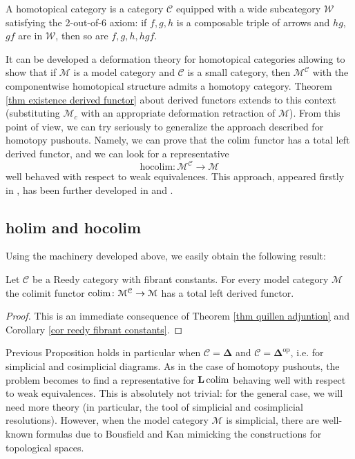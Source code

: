 \begin{refsection}
\begin{defin}
A homotopical category is a category $\mathcal C$ equipped with a wide subcategory $\mathcal W$ satisfying the 2-out-of-6 axiom: if $f,g,h$ is a composable triple of arrows and $hg$, $gf$ are in $\mathcal W$, then so are $f,g,h,hgf$.
\end{defin}

It can be developed a deformation theory for homotopical categories allowing to show that if $\mathcal M$ is a model category and $\mathcal C$ is a small category, then $\mathcal M^{\mathcal C}$ with the componentwise homotopical structure admits a homotopy category. Theorem \ref{thm existence derived functor} about derived functors extends to this context (substituting $\mathcal M_c$ with an appropriate deformation retraction of $\mathcal M$). From this point of view, we can try seriously to generalize the approach described for homotopy pushouts. Namely, we can prove that the $\operatorname*{colim}$ functor has a total left derived functor, and we can look for a representative
\[
\mathrm{hocolim} \colon \mathcal M^{\mathcal C} \to \mathcal M
\]
well behaved with respect to weak equivalences. This approach, appeared firstly in \cite{dhk}, has been further developed in \cite{shulman} and \cite{riehl}.


\subsection{holim and hocolim}

Using the machinery developed above, we easily obtain the following result:

\begin{prop}
Let $\mathcal C$ be a Reedy category with fibrant constants. For every model category $\mathcal M$ the colimit functor $\operatorname*{colim} \colon \mathcal M^{\mathcal C} \to \mathcal M$ has a total left derived functor.
\end{prop}

\begin{proof}
This is an immediate consequence of Theorem \ref{thm quillen adjuntion} and Corollary \ref{cor reedy fibrant constants}.
\end{proof}

Previous Proposition holds in particular when $\mathcal C = \boldsymbol\Delta$ and $\mathcal C = \boldsymbol\Delta^{\mathrm{op}}$, i.e. for simplicial and cosimplicial diagrams. As in the case of homotopy pushouts, the problem becomes to find a representative for $\mathbf L \operatorname*{colim}$ behaving well with respect to weak equivalences. This is absolutely not trivial: for the general case, we will need more theory (in particular, the tool of simplicial and cosimplicial resolutions). However, when the model category $\mathcal M$ is simplicial, there are well-known formulas due to Bousfield and Kan mimicking the constructions for topological spaces.


\end{refsection}
